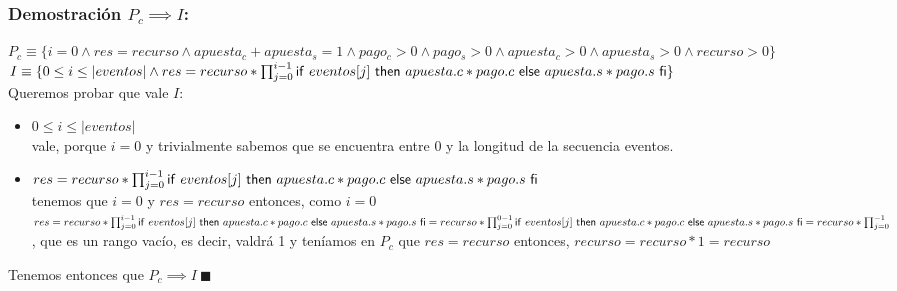 \documentclass[10pt,a4paper]{article}
\begin{document}
\subsubsection*{Demostración $P_c \implies I$:}
\noindent $P_c \equiv \{i = 0 \land res = recurso \land apuesta_c + apuesta_s = 1 \land pago_c > 0 \land pago_s > 0 \land apuesta_c > 0 \land apuesta_s > 0 \land recurso > 0\}$ \\
$I \equiv \{ 0 \leq i \leq |eventos| \land res = recurso * \prod_{j = 0}^{i - 1} \mathsf{if}\ eventos[j]\ \mathsf{then}\ apuesta.c *pago.c\ \mathsf{else}\ apuesta.s * pago.s\ \mathsf{fi}\}$ \\
Queremos probar que vale $I$:
\begin{itemize}
	\item $0 \leq i \leq |eventos|$ \\ vale, porque $i = 0$ y trivialmente sabemos que se encuentra entre 0 y la longitud de la secuencia eventos.
	\item $res = recurso * \prod_{j = 0}^{i - 1} \mathsf{if}\ eventos[j]\ \mathsf{then}\ apuesta.c *pago.c\ \mathsf{else}\ apuesta.s * pago.s\ \mathsf{fi}$ \\ tenemos que $i = 0$ y $res = recurso$ entonces, como $i = 0$ \\ 
	$res = recurso * \prod_{j = 0}^{i - 1} \mathsf{if}\ eventos[j]\ \mathsf{then}\ apuesta.c *pago.c\ \mathsf{else}\ apuesta.s * pago.s\ \mathsf{fi} = \\ recurso * \prod_{j = 0}^{0 - 1} \mathsf{if}\ eventos[j]\ \mathsf{then}\ apuesta.c *pago.c\ \mathsf{else}\ apuesta.s * pago.s\ \mathsf{fi} = recurso * \prod_{j = 0}^{-1}$, que es un rango vacío, es decir, valdrá 1 y teníamos en $P_c$ que $res = recurso$ entonces, $recurso = recurso * 1 = recurso$
\end{itemize}
Tenemos entonces que $P_c \implies I\ \blacksquare$
\end{document}

